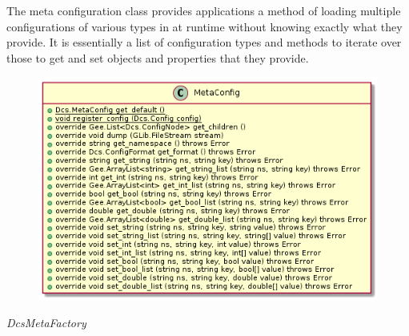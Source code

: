       \vspace*{-0.75cm}
      \begin{minipage}[t]{0.5\textwidth}
      	\vspace*{0.5cm}
        The meta configuration class provides applications a method of loading
        multiple configurations of various types in at runtime without knowing
        exactly what they provide. It is essentially a list of configuration
        types and methods to iterate over those to get and set objects and
        properties that they provide.
      \end{minipage} \hfill
      \begin{minipage}[t]{0.45\textwidth}
        \begin{figure}[H]
          \includegraphics[width=\textwidth]{figures/design/class/core/meta-config}
          \label{fig:dsg-classes-meta-config}
        \end{figure}
      \end{minipage}

      \emph{DcsMetaFactory}

